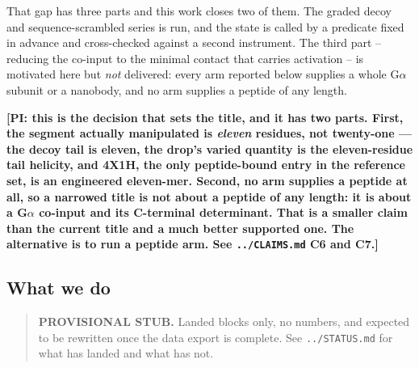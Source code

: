 That gap has three parts and this work closes two of them. The graded decoy and sequence-scrambled
series is run, and the state is called by a predicate fixed in advance and cross-checked against a
second instrument. The third part -- reducing the co-input to the minimal contact that carries
activation -- is motivated here but \emph{not} delivered: every arm reported below supplies a whole
G$\alpha$ subunit or a nanobody, and no arm supplies a peptide of any length.

\textbf{[PI: this is the decision that sets the title, and it has two parts. First, the segment
actually manipulated is \emph{eleven} residues, not twenty-one --- the decoy tail is eleven, the
drop's varied quantity is the eleven-residue tail helicity, and 4X1H, the only peptide-bound entry
in the reference set, is an engineered eleven-mer. Second, no arm supplies a peptide at all, so a
narrowed title is not about a peptide of any length: it is about a G$\alpha$ co-input and its
C-terminal determinant. That is a smaller claim than the current title and a much better supported
one. The alternative is to run a peptide arm. See \texttt{../CLAIMS.md} C6 and C7.]}


\subsection{What we do}

\begin{quote}
\textbf{PROVISIONAL STUB.} Landed blocks only, no numbers, and expected to be rewritten once the data
export is complete. See \texttt{../STATUS.md} for what has landed and what has not.
\end{quote}

